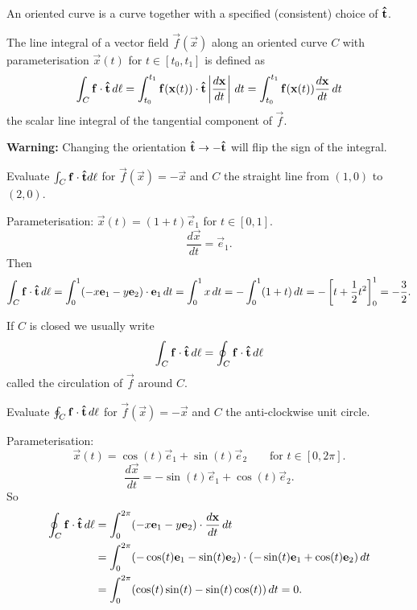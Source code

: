 \documentclass[10pt, a4paper]{article}
\begin{document}
An oriented curve is a curve together with a specified
(consistent)
choice of $\mathbf{\hat{t}}$.

The line integral of a vector field $\vec{f}(\vec{x})$ along an oriented curve $C$ with parameterisation $\vec{x}(t)$ for $t \in [t_0, t_1]$ is defined as
\[
\int_{C}\mathbf{f}\cdot\mathbf{\hat{t}}\,d\ell = \int_{t_0}^{t_1}\mathbf{f}(\mathbf{x}(t))\cdot\mathbf{\hat{t}}\left|\frac{d\mathbf{x}}{dt}\right|\,dt = \int_{t_0}^{t_1}\mathbf{f}(\mathbf{x}(t))\frac{d\mathbf{x}}{dt}\,dt
\]
the scalar line integral of the tangential component of $\vec{f}$.

\textbf{Warning:}
Changing the orientation $\mathbf{\hat{t}} \to -\mathbf{\hat{t}}$ will flip the sign of the integral.

\begin{example}
    Evaluate $\int_{C}\mathbf{f}\cdot\mathbf{\hat{t}}d\ell$ for $\vec{f}(\vec{x}) = -\vec{x}$ and $C$ the straight line from $(1, 0)$ to $(2, 0)$.

    Parameterisation:
    $\vec{x}(t) = (1 + t)\vec{e}_1$ for $t \in [0, 1]$.
    \[
    \frac{d\vec{x}}{dt} = \vec{e}_1.
    \]
    Then
    \[
    \int_{C}\mathbf{f}\cdot\mathbf{\hat{t}}\,d\ell = \int_{0}^{1}(-x\mathbf{e}_1 - y\mathbf{e}_2) \cdot \mathbf{e}_1\,dt = \int_{0}^{1}x\,dt = -\int_{0}^{1}(1 + t)\,dt = -\left[t + \frac{1}{2}t ^ 2\right]_{0}^{1} = -\frac{3}{2}.
    \]
\end{example}

If $C$ is closed we usually write
\[
\int_{C}\mathbf{f}\cdot\mathbf{\hat{t}}\,d\ell = \oint_{C}\mathbf{f}\cdot\mathbf{\hat{t}}\,d\ell
\]
called the circulation of $\vec{f}$ around $C$.

\begin{example}
    Evaluate $\oint_{C}\mathbf{f}\cdot\mathbf{\hat{t}}\,d\ell$ for $\vec{f}(\vec{x}) = -\vec{x}$ and $C$ the anti-clockwise unit circle.
    
    \begin{solution}
        Parameterisation:
        \[
        \vec{x}(t) = \cos(t)\vec{e}_1 + \sin(t)\vec{e}_2\qquad\text{for } t \in [0, 2\pi].
        \]
        \[
        \frac{d\vec{x}}{dt} = -\sin(t)\vec{e}_1 + \cos(t)\vec{e}_2.
        \]
        So
        \begin{align*}
            \oint_{C}\mathbf{f}\cdot\mathbf{\hat{t}}\,d\ell &= \int_{0}^{2\pi}(-x\mathbf{e}_1 - y\mathbf{e}_2)\cdot \frac{d\mathbf{x}}{dt}\,dt \\
            &= \int_{0}^{2\pi}(-\cos(t)\mathbf{e}_1 - \sin(t)\mathbf{e}_2)\cdot(-\sin(t)\mathbf{e}_1 + \cos(t)\mathbf{e}_2)\,dt \\
            &= \int_{0}^{2\pi}(\cos(t)\sin(t) - \sin(t)\cos(t))\,dt = 0.
        \end{align*}
    \end{solution}
\end{example}
\end{document}
